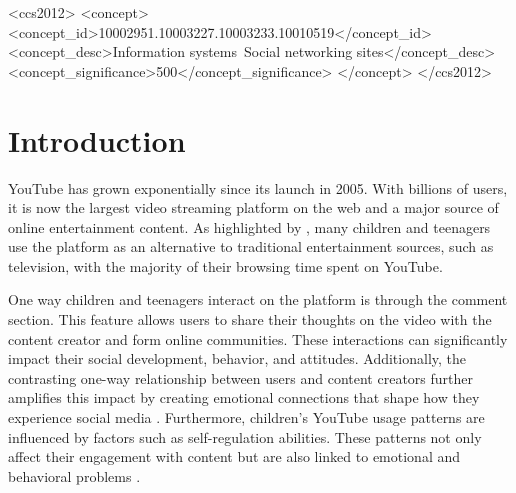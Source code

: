 \documentclass[sigconf]{acmart}
\begin{document}
\begin{CCSXML}
<ccs2012>
   <concept>
       <concept_id>10002951.10003227.10003233.10010519</concept_id>
       <concept_desc>Information systems~Social networking sites</concept_desc>
       <concept_significance>500</concept_significance>
       </concept>
 </ccs2012>
\end{CCSXML}



\maketitle

\section{Introduction}
YouTube has grown exponentially since its launch in 2005. With billions of users, it is now the 
largest video streaming platform on the web and a major source of online entertainment content. 
As highlighted by \cite{app13064044}, many children and teenagers use the platform as an alternative to 
traditional entertainment sources, such as television, with the majority of their 
browsing time spent on YouTube. 

One way children and teenagers interact on the platform is through the comment section. 
This feature allows users to share their thoughts on the video with the content creator and form online 
communities. These interactions can significantly impact their social development, behavior, and 
attitudes. Additionally, the contrasting one-way relationship between users and content creators 
further amplifies this impact by creating emotional connections that shape how they experience social
media \cite{lozano2023social}. 
Furthermore, children's YouTube usage patterns are influenced by factors such as self-regulation 
abilities. These patterns not only affect their engagement with content but are also linked to 
emotional and behavioral problems \cite{kim2024temperament}.
\end{document}
